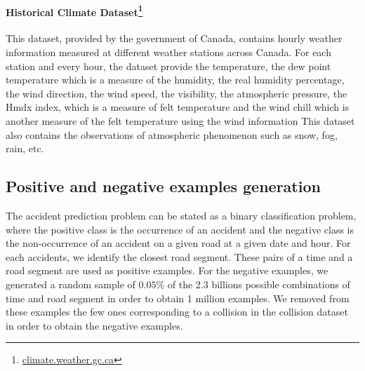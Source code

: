 \documentclass[conference]{IEEEtran}
\begin{document}
\paragraph{Historical Climate Dataset\protect\footnote{\url{climate.weather.gc.ca}}}

This dataset, provided by the government of Canada, contains hourly weather
information measured at different weather stations across Canada. For each
station and every hour, the dataset provide the temperature, the dew point
temperature which is a measure of the humidity, the real humidity percentage,
the wind direction, the wind speed, the visibility, the atmospheric pressure,
the Hmdx index, which is a measure of felt temperature and the wind chill 
which is another measure of the felt temperature using the wind information
This dataset also contains the observations of atmospheric phenomenon such
as snow, fog, rain, etc.

\subsection{Positive and negative examples generation}

The accident prediction problem can be stated as a binary classification
problem, where the positive class is the occurrence of an accident and the
negative class is the non-occurrence of an accident on a given road at a
given date and hour. For each accidents, we identify the
closest road segment. These pairs of a time and a road segment are used as
positive examples. For the negative examples, we generated a random sample
of $0.05\%$ of the 2.3 billions possible combinations of time and road segment
in order to obtain 1 million examples. We removed from these examples the few
ones corresponding to a collision in the collision dataset in order to obtain
the negative examples.
\end{document}
